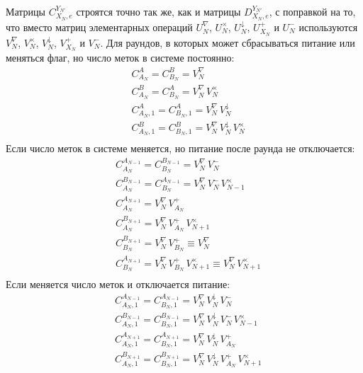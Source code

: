 Матрицы $C_{X_N,e}^{Y_{N'}}$ строятся точно так же, как и матрицы $D_{X_N,e}^{Y_{N'}}$, с поправкой на то, что вместо матриц элементарных операций $U_N^\nabla$, $U_N^\times$, $U_N^\downarrow$, $U_{X_N}^+$ и $U_N^-$ используются $V_N^\nabla$, $V_N^\times$, $V_N^\downarrow$, $V_{X_N}^+$ и $V_N^-$.  Для раундов, в которых может сбрасываться питание или меняться флаг, но число меток в системе постоянно:
\begin{equation}\label{eq:ch3_fg_ops_1}
	\begin{aligned}
		&C_{A_N}^{A}         = C_{B_N}^{B}         = V_N^\nabla\\
		&C_{A_N}^{B}         = C_{B_N}^{A}         = V_N^\nabla\, V_N^\times\\
		&C_{A_N,1}^{A}       = C_{B_N,1}^{A}       = V_N^\nabla\, V_N^\downarrow\\
		&C_{A_N,1}^{B}       = C_{B_N,1}^{B}       = V_N^\nabla\, V_N^\downarrow\, V_N^\times\\
	\end{aligned}
\end{equation}
Если число меток в системе меняется, но питание после раунда не отключается:
\begin{equation}\label{eq:ch3_fg_ops_2}
	\begin{aligned}
		&C_{A_N}^{A_{N-1}}   = C_{B_N}^{B_{N-1}}                        =      V_N^\nabla\, V_N^-\\
		&C_{A_N}^{B_{N-1}}   = C_{B_N}^{A_{N-1}}                        =      V_N^\nabla\, V_N^-\, V_{N-1}^\times\\
		&C_{A_N}^{A_{N+1}}   = V_N^\nabla\, V_{A_N}^+\\
		&C_{A_N}^{B_{N+1}}   = V_N^\nabla\, V_{A_N}^+\, V_{N+1}^\times\\
		&C_{B_N}^{B_{N+1}}   = V_N^\nabla\, V_{B_N}^+                   \equiv V_N^\nabla\\
		&C_{B_N}^{A_{N+1}}   = V_N^\nabla\, V_{B_N}^+\, V_{N+1}^\times  \equiv V_N^\nabla\, V_{N+1}^\times\\
	\end{aligned}
\end{equation}
Если меняется число меток и отключается питание:
\begin{equation}\label{eq:ch3_fg_ops_3}
	\begin{aligned}
		&C_{A_N,1}^{A_{N-1}} = C_{B_N,1}^{A_{N-1}} = V_N^\nabla\, V_N^\downarrow\, V_N^-\\
		&C_{A_N,1}^{B_{N-1}} = C_{B_N,1}^{B_{N-1}} = V_N^\nabla\, V_N^\downarrow\, V_N^-\, V_{N-1}^\times\\
		&C_{A_N,1}^{A_{N+1}} = C_{B_N,1}^{A_{N+1}} = V_N^\nabla\, V_N^\downarrow\, V_{A_N}^+\\
		&C_{A_N,1}^{B_{N+1}} = C_{B_N,1}^{B_{N+1}} = V_N^\nabla\, V_N^\downarrow\, V_{A_N}^+ \, V_{N+1}^\times
	\end{aligned}
\end{equation}




